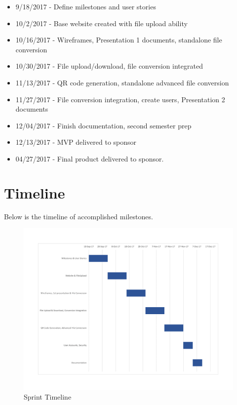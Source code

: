 \begin{itemize}
	\item 9/18/2017   - Define milestones and user stories

	\item 10/2/2017   - Base website created with file upload ability
	
	\item 10/16/2017  - Wireframes, Presentation 1 documents, standalone file conversion
	
	\item 10/30/2017  - File upload/download, file conversion integrated
	
	\item 11/13/2017  - QR code generation, standalone advanced file conversion 
	
	\item 11/27/2017  - File conversion integration, create users, Presentation 2 documents
	
	\item 12/04/2017  - Finish documentation, second semester prep
	
	\item 12/13/2017  - MVP delivered to sponsor
	
	\item 04/27/2017  - Final product delivered to sponsor.
\end{itemize}

\section{Timeline}
Below is the timeline of accomplished milestones.

\begin{figure}[H]
\begin{center}
\includegraphics[width=1\textwidth]{./SprintGanattChart}
\end{center}
\caption{Sprint Timeline}
\end{figure}
